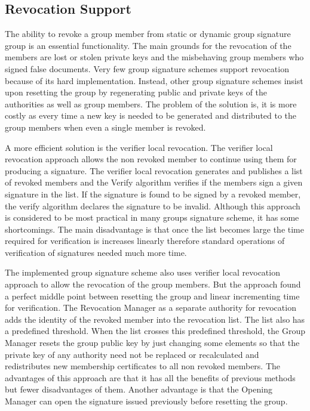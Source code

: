 \subsection{Revocation Support}
The ability to revoke a group member from static or dynamic group signature group is an essential functionality. The main grounds for the revocation of the members are lost or stolen private keys and the misbehaving group members who signed false documents. Very few group signature schemes support revocation because of its hard implementation. Instead, other group signature schemes insist upon resetting the group by regenerating public and private keys of the authorities as well as group members. The problem of the solution is, it is more costly as every time a new key is needed to be generated and distributed to the group members when even a single member is revoked.

A more efficient solution is the verifier local revocation. The verifier local revocation approach allows the non revoked member to continue using them for producing a signature. The verifier local revocation generates and publishes a list of revoked members and the Verify algorithm verifies if the members sign a given signature in the list. If the signature is found to be signed by a revoked member, the verify algorithm declares the signature to be invalid. Although this approach is considered to be most practical in many groups signature scheme, it has some shortcomings. The main disadvantage is that once the list becomes large the time required for verification is increases linearly therefore standard operations of verification of signatures needed much more time. 

The implemented group signature scheme also uses verifier local revocation approach to allow the revocation of the group members. But the approach found a perfect middle point between resetting the group and linear incrementing time for verification. The Revocation Manager as a separate authority for revocation adds the identity of the revoked member into the revocation list. The list also has a predefined threshold. When the list crosses this predefined threshold, the Group Manager resets the group public key by just changing some elements so that the private key of any authority need not be replaced or recalculated and redistributes new membership certificates to all non revoked members. The advantages of this approach are that it has all the benefits of previous methods but fewer disadvantages of them. Another advantage is that the Opening Manager can open the signature issued previously before resetting the group. 

